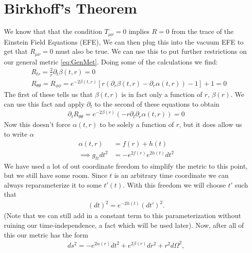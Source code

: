 \documentclass[11pt,table]{article}
\begin{document}
        \section{Birkhoff's Theorem}\label{sec:bkhfsthm}
            We know that that the condition $T_{\mu\nu}=0$ implies $R=0$ from the trace of the Einstein Field Equations (EFE), We can then plug this into the vacuum EFE to get that $R_{\mu\nu}=0$ must also be true.  We can use this to put further restrictions on our general metric \eqref{eq:GenMet}.  Doing some of the calculations we find:
            \begin{align}
                &R_{tr}=\frac{2}{r}\partial_t\beta(t,r) = 0\label{eq:Rtr}\\
                &R_{\theta\theta}=R_{\phi\phi}=e^{-2\beta(t,r)}[r(\partial_r\beta(t,r)-\partial_r\alpha(t,r))-1]+1 = 0\label{eq:Rpp}
            \end{align}
            The first of these tells us that $\beta(t,r)$ is in fact only a function of $r$, $\beta(r)$.  We can use this fact and apply $\partial_t$ to the second of these equations to obtain
            \begin{align*}
                \partial_t R_{\theta\theta} = e^{-2\beta(r)}(-r\partial_t\partial_r\alpha(t,r))=0
            \end{align*}
            Now this doesn't force $\alpha(t,r)$ to be solely a function of $r$, but it does allow us to write $\alpha$
            \begin{align}
                \alpha(t,r)&= f(r)+h(t)\\
                \implies g_{tt}dt^2&=-e^{2f(r)}e^{2h(t)}dt^2\label{eq:alpharestriction1}
            \end{align}
            We have used a lot of out coordinate freedom to simplify the metric to this point, but we still have some room.  Since $t$ is an arbitrary time coordinate we can always reparameterize it to some $t'(t)$.
             With this freedom we will choose $t'$ such that
            \begin{align}
                (dt)^2=e^{-2h(t)}(dt')^2.
            \end{align}
            (Note that we can still add in a constant term to this parameterization without ruining our time-independence, a fact which will be used later).  Now, after all of this our metric has the form
            \begin{align}\label{GenMet2}
                ds^2 = -e^{2\alpha(r)}dt^2+e^{2\beta(r)}dr^2 +
                r^2d\Omega^2,
            \end{align}
\end{document}
